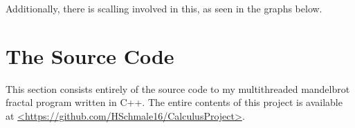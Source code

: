 \documentclass[10pt,oneside,letter]{article}
\begin{document}
Additionally, there is scalling involved in this, as seen in the graphs below.


\section{The Source Code}
This section consists entirely of the source code to my multithreaded
mandelbrot fractal program written in C++. The entire contents of this project
is available at \url{<https://github.com/HSchmale16/CalculusProject>}.

\end{document}
